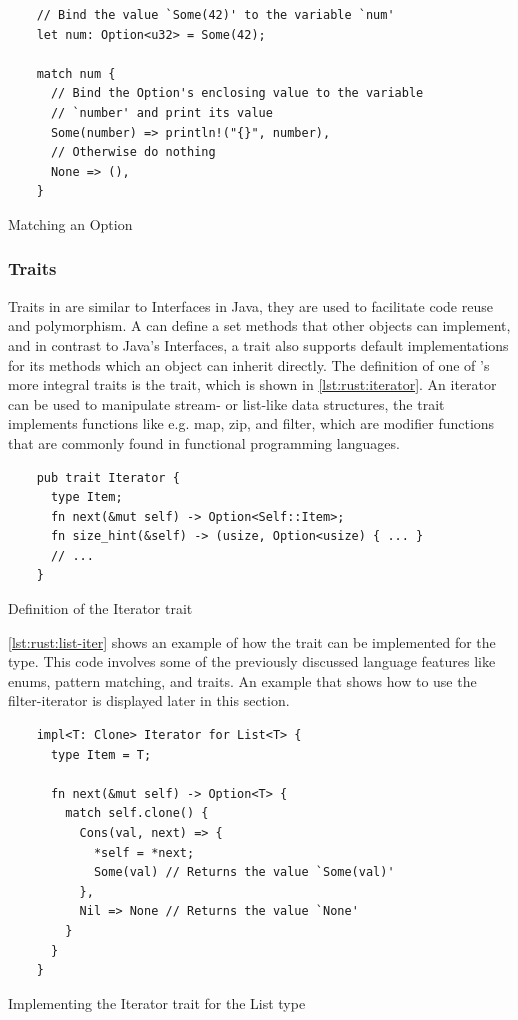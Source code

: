 \begin{listing}[H]
  \begin{verbatim}
    // Bind the value `Some(42)' to the variable `num'
    let num: Option<u32> = Some(42);

    match num {
      // Bind the Option's enclosing value to the variable
      // `number' and print its value
      Some(number) => println!("{}", number),
      // Otherwise do nothing
      None => (),
    }
  \end{verbatim}
  \caption{Matching an Option}
  \label{lst:rust:match}
\end{listing}

\subsubsection{Traits}

Traits in {\rust} are similar to Interfaces in Java, they are used to facilitate code reuse and polymorphism.
A  can define a set methods that other objects can implement, and in contrast to Java's Interfaces, a trait also supports default implementations for its methods which an object can inherit directly.
The definition of one of {\rust}'s more integral traits is the  trait, which is shown in \autoref{lst:rust:iterator}.
An iterator can be used to manipulate stream- or list-like data structures, the trait implements functions like e.g. map, zip, and filter, which are modifier functions that are commonly found in functional programming languages.

\begin{listing}[H]
  \begin{verbatim}
    pub trait Iterator {
      type Item;
      fn next(&mut self) -> Option<Self::Item>;
      fn size_hint(&self) -> (usize, Option<usize) { ... }
      // ...
    }
  \end{verbatim}
  \caption{Definition of the Iterator trait}
  \label{lst:rust:iterator}
\end{listing}

\autoref{lst:rust:list-iter}  shows an example of how the  trait can be implemented for the  type.
This code involves some of the previously discussed language features like enums, pattern matching, and traits.
An example that shows how to use the filter-iterator is displayed later in this section.

\begin{listing}[H]
  \begin{verbatim}
    impl<T: Clone> Iterator for List<T> {
      type Item = T;

      fn next(&mut self) -> Option<T> {
        match self.clone() {
          Cons(val, next) => {
            *self = *next;
            Some(val) // Returns the value `Some(val)'
          },
          Nil => None // Returns the value `None'
        }
      }
    }
  \end{verbatim}
  \caption{Implementing the Iterator trait for the List type}
  \label{lst:rust:list-iter}
\end{listing}


